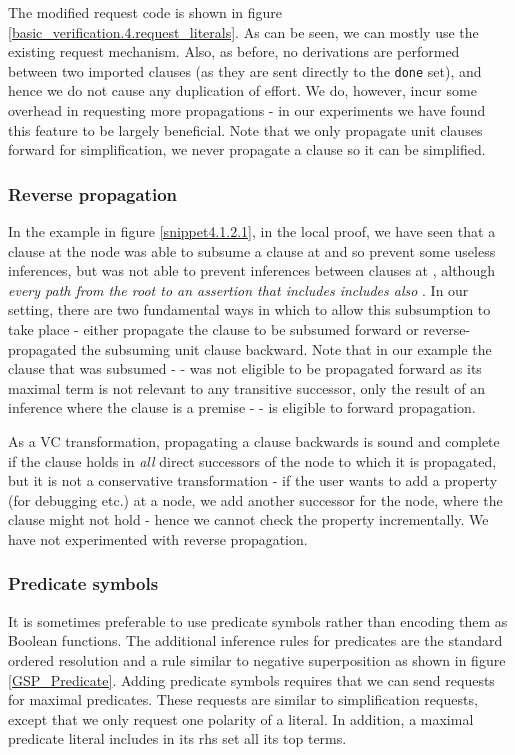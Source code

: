 The modified request code is shown in figure \ref{basic_verification.4.request_literals}.
As can be seen, we can mostly use the existing request mechanism. 
Also, as before, no derivations are performed between two imported clauses (as they are sent directly to the \lstinline|done| set), and hence we do not cause any duplication of effort. We do, however, incur some overhead in requesting more propagations - in our experiments we have found this feature to be largely beneficial. Note that we only propagate unit clauses forward for simplification, we never propagate a clause so it can be simplified.

\subsubsection*{Reverse propagation}
In the example in figure \ref{snippet4.1.2.1}, in the local proof, we have seen that a clause  at the node  was able to subsume a clause at  and so prevent some useless inferences, but was not able to prevent inferences between clauses at , although \emph{every path from the root to an assertion that includes  includes also }.
In our setting, there are two fundamental ways in which to allow this subsumption to take place - either propagate the clause to be subsumed forward or reverse-propagated the subsuming unit clause backward. 
Note that in our example the clause that was subsumed -  - was not eligible to be propagated forward as its maximal term is not relevant to any transitive successor, only the result of an inference where the clause is a premise -  - is eligible to forward propagation. 

As a VC transformation, propagating a clause backwards is sound and complete if the clause holds in \emph{all} direct successors of the node to which it is propagated, but it is not a conservative transformation - if the user wants to add a property (for debugging etc.) at a node, we add another successor for the node, where the clause might not hold - hence we cannot check the property incrementally.
We have not experimented with reverse propagation. 

\subsubsection*{Predicate symbols}
It is sometimes preferable to use predicate symbols rather than encoding them as Boolean functions. The additional inference rules for predicates are the standard ordered resolution and a rule similar to negative superposition as shown in figure \ref{GSP_Predicate}.
Adding predicate symbols requires that we can send requests for maximal predicates.
These requests are similar to simplification requests, except that we only request one polarity of a literal.
In addition, a maximal predicate literal includes in its rhs set all its top terms.

